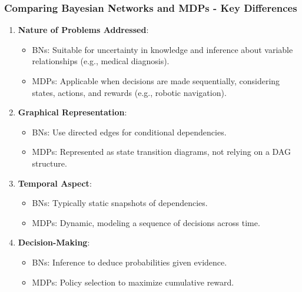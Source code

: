 \documentclass[aspectratio=169]{beamer}
\begin{document}
\begin{frame}[fragile]
    \frametitle{Comparing Bayesian Networks and MDPs - Key Differences}
    \begin{enumerate}
        \item \textbf{Nature of Problems Addressed}:
            \begin{itemize}
                \item BNs: Suitable for uncertainty in knowledge and inference about variable relationships (e.g., medical diagnosis).
                \item MDPs: Applicable when decisions are made sequentially, considering states, actions, and rewards (e.g., robotic navigation).
            \end{itemize}
        
        \item \textbf{Graphical Representation}:
            \begin{itemize}
                \item BNs: Use directed edges for conditional dependencies.
                \item MDPs: Represented as state transition diagrams, not relying on a DAG structure.
            \end{itemize}
        
        \item \textbf{Temporal Aspect}:
            \begin{itemize}
                \item BNs: Typically static snapshots of dependencies.
                \item MDPs: Dynamic, modeling a sequence of decisions across time.
            \end{itemize}
        
        \item \textbf{Decision-Making}:
            \begin{itemize}
                \item BNs: Inference to deduce probabilities given evidence.
                \item MDPs: Policy selection to maximize cumulative reward.
            \end{itemize}
    \end{enumerate}
\end{frame}
\end{document}
